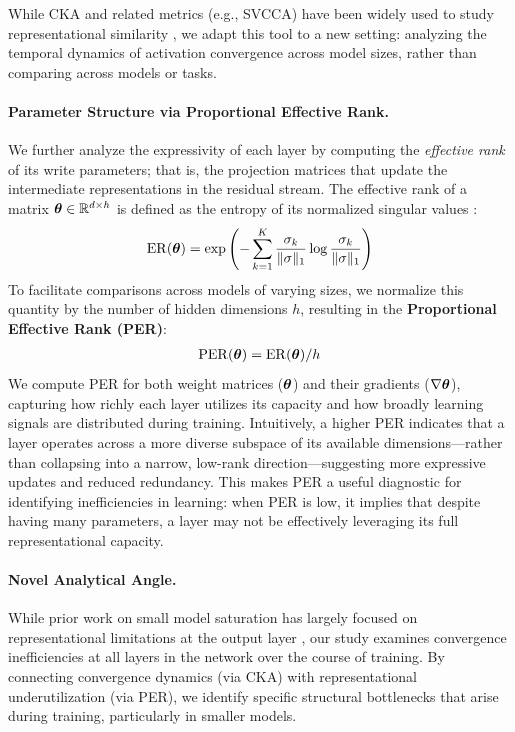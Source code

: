 While CKA and related metrics (e.g., SVCCA) have been widely used to study representational similarity \citep{wu2020similarity, phang2021finetuned, brown2023understanding}, we adapt this tool to a new setting: analyzing the temporal dynamics of activation convergence across model sizes, rather than comparing across models or tasks.

\paragraph{Parameter Structure via Proportional Effective Rank.}
We further analyze the expressivity of each layer by computing the \textit{effective rank} of its write parameters; that is, the projection matrices that update the intermediate representations in the residual stream. The effective rank of a matrix $\boldsymbol{\theta} \in \mathbb{R}^{d \times h}$ is defined as the entropy of its normalized singular values \citep{roy2007effectiverank}:
\begin{align}
    \mathrm{ER}(\boldsymbol{\theta}) = \exp\left(-\sum_{k=1}^K \frac{\sigma_k}{\|\sigma\|_1} \log \frac{\sigma_k}{\|\sigma\|_1}\right)
\end{align}
To facilitate comparisons across models of varying sizes, we normalize this quantity by the number of hidden dimensions $h$, resulting in the \textbf{Proportional Effective Rank (PER)}:
\begin{align}
    \mathrm{PER}(\boldsymbol{\theta}) = \mathrm{ER}(\boldsymbol{\theta}) / h
\end{align}
We compute PER for both weight matrices ($\boldsymbol{\theta}$) and their gradients ($\nabla \boldsymbol{\theta}$), capturing how richly each layer utilizes its capacity and how broadly learning signals are distributed during training. Intuitively, a higher PER indicates that a layer operates across a more diverse subspace of its available dimensions—rather than collapsing into a narrow, low-rank direction—suggesting more expressive updates and reduced redundancy. This makes PER a useful diagnostic for identifying inefficiencies in learning: when PER is low, it implies that despite having many parameters, a layer may not be effectively leveraging its full representational capacity.


\paragraph{Novel Analytical Angle.}
While prior work on small model saturation has largely focused on representational limitations at the output layer \citep{godey2024small, yang2018breaking}, our study examines convergence inefficiencies at all layers in the network over the course of training. By connecting convergence dynamics (via CKA) with representational underutilization (via PER), we identify specific structural bottlenecks that arise during training, particularly in smaller models.

